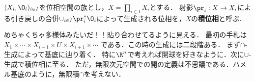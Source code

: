 \documentclass[uplatex,dvipdfmx]{jsreport}
\begin{document}
\begin{definition}[族の積位相]
    $(X_i,\O_i)_{i\in I}$を位相空間の族とし，$X=\prod_{i\in I}X_i$とする．
    射影$\pr_i:X\to X_i$による引き戻しの合併$\cup_{i\in I}\pr_i^*\O_i$によって生成される位相を，$X$の\textbf{積位相}と呼ぶ．
\end{definition}
\begin{remark}
    めちゃくちゃ多様体みたいだ！！貼り合わせてるように見える．
    最初の手札は$X_1\times\cdots\times X_{i-1}\times U\times X_{i+1}\times\cdots$
    である．この時の生成には二段階ある．
    まず$\cap$-生成によって基底に辿り着く．
    特に$\R^n$で考えれば開球を好きなように．次に$\cup$-生成で積位相に至る．
    ただ，無限次元空間での開の定義は不思議である．ハメル基底のように，無限積$\cap$を考えない．
\end{remark}
\end{document}
